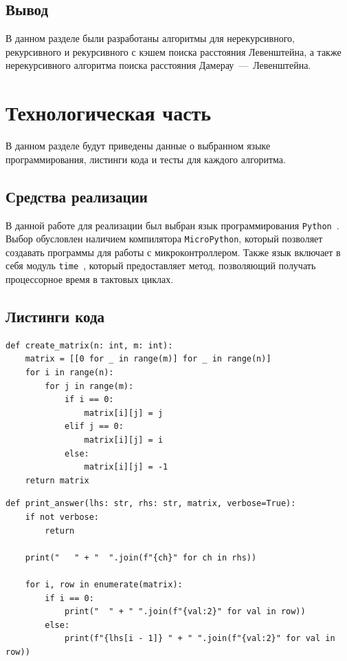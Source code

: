 \documentclass[a4paper, 12pt]{extreport}
\begin{document}
\clearpage



\section*{Вывод}
В данном разделе были разработаны алгоритмы для нерекурсивного, рекурсивного и рекурсивного с кэшем поиска расстояния Левенштейна, а также нерекурсивного алгоритма поиска расстояния Дамерау~---~Левенштейна.
\clearpage


\chapter{Технологическая часть}
В данном разделе будут приведены данные о выбранном языке программирования, листинги кода и тесты для каждого алгоритма.
\section{Средства реализации}
В данной работе для реализации был выбран язык программирования \texttt{Python}~\cite{bib2}. Выбор обусловлен наличием компилятора \texttt{MicroPython}, который позволяет создавать программы для работы с микроконтроллером. 
Также язык включает в себя модуль \texttt{time}~\cite{bib3}, который предоставляет метод, позволяющий получать процессорное время в тактовых циклах. 

\section{Листинги кода}
\begin{center}
\captionsetup{justification=raggedright,singlelinecheck=off}
\begin{lstlisting}[label=lst:create_matrix,caption=Реализация создания матрицы для расстояния Левенштейна]
def create_matrix(n: int, m: int):
    matrix = [[0 for _ in range(m)] for _ in range(n)]
    for i in range(n):
        for j in range(m):
            if i == 0:
                matrix[i][j] = j
            elif j == 0:
                matrix[i][j] = i
            else:
                matrix[i][j] = -1
    return matrix
\end{lstlisting}
\end{center}


\begin{center}
\captionsetup{justification=raggedright,singlelinecheck=off}
\begin{lstlisting}[label=lst:print_answer,caption=Реализация вывода матрицы расстояний]
def print_answer(lhs: str, rhs: str, matrix, verbose=True):
    if not verbose:
        return  

    print("   " + "  ".join(f"{ch}" for ch in rhs))  
    
    for i, row in enumerate(matrix):
        if i == 0:
            print("  " + " ".join(f"{val:2}" for val in row))  
        else:
            print(f"{lhs[i - 1]} " + " ".join(f"{val:2}" for val in row)) 
\end{lstlisting}
\end{center}
\end{document}
